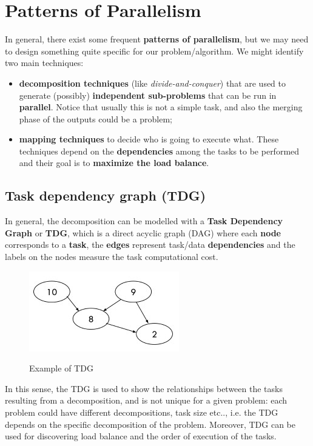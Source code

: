 \section{Patterns of Parallelism}\label{ch4}
In general, there exist some frequent \textbf{patterns of parallelism}, but we may need to design something quite specific for our problem/algorithm. We might identify two main techniques:

\begin{itemize}
    \item \textbf{decomposition techniques} (like \textit{divide-and-conquer}) that are used to generate (possibly) \textbf{independent sub-problems} that can be run in \textbf{parallel}. Notice that usually this is not a simple task, and also the merging phase of the outputs could be a problem;
    \item \textbf{mapping techniques} to decide who is going to execute what. These techniques depend on the \textbf{dependencies} among the tasks to be performed and their goal is to \textbf{maximize the load balance}.
\end{itemize}

\subsection{Task dependency graph (TDG)}
In general, the decomposition can be modelled with a \textbf{Task Dependency Graph} or \textbf{TDG}, which is a direct acyclic graph (DAG) where each \textbf{node} corresponds to a \textbf{task}, the \textbf{edges} represent task/data \textbf{dependencies} and the labels on the nodes measure the task computational cost.

\begin{figure}[h!]
		\centering
		\includegraphics[scale = 2.0]{img/tdg.jpg}
        \label{tdg}
        \caption{Example of TDG}
\end{figure}

In this sense, the TDG is used to show the relationships between the tasks resulting from a decomposition, and is not unique for a given problem: each problem could have different decompositions, task size etc.., i.e. the TDG depends on the specific decomposition of the problem. Moreover, TDG can be used for discovering load balance and the order of execution of the tasks.

